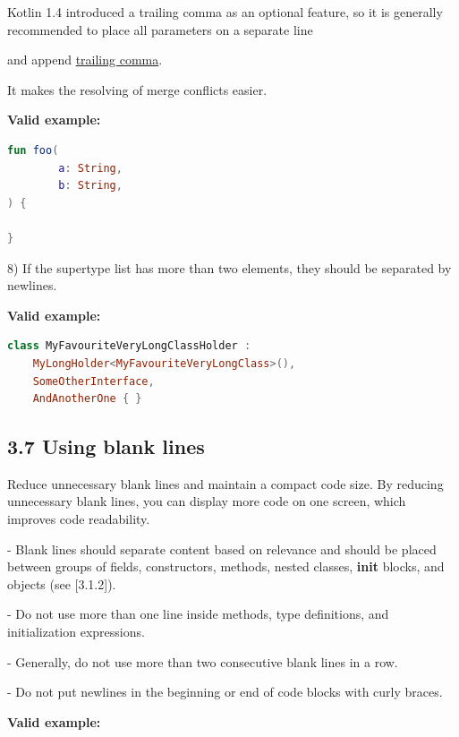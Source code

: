 {{{{{{{{{{{{{{{{{{Kotlin 1.4 introduced a trailing comma as an optional feature, so it is generally recommended to place all parameters on a separate line

and append \href{https://kotlinlang.org/docs/reference/whatsnew14.html#trailing-comma}{trailing comma}.

It makes the resolving of merge conflicts easier.



\textbf{Valid example:} 

\begin{lstlisting}[language=Kotlin]
fun foo(
        a: String,
        b: String,
) {

}
\end{lstlisting}


8) If the supertype list has more than two elements, they should be separated by newlines.



\textbf{Valid example:} 

\begin{lstlisting}[language=Kotlin]
class MyFavouriteVeryLongClassHolder :
    MyLongHolder<MyFavouriteVeryLongClass>(),
    SomeOtherInterface,
    AndAnotherOne { }
\end{lstlisting}


\subsection*{\textbf{3.7 Using blank lines}}

\label{sec:3.7}



Reduce unnecessary blank lines and maintain a compact code size. By reducing unnecessary blank lines, you can display more code on one screen, which improves code readability.

- Blank lines should separate content based on relevance and should be placed between groups of fields, constructors, methods, nested classes, \textbf{init} blocks, and objects (see [3.1.2]).

- Do not use more than one line inside methods, type definitions, and initialization expressions.

- Generally, do not use more than two consecutive blank lines in a row.

- Do not put newlines in the beginning or end of code blocks with curly braces.



\textbf{Valid example:}

}}}}}}}}}}}}}}}}}}
